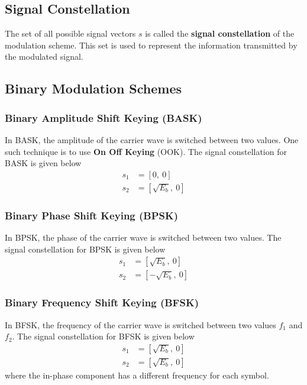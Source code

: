 \documentclass{article}
\begin{document}
\subsection{Signal Constellation}
The set of all possible signal vectors \(s\) is called the
\textbf{signal constellation} of the modulation scheme. This set is
used to represent the information transmitted by the modulated signal.
\subsection{Binary Modulation Schemes}
\subsubsection{Binary Amplitude Shift Keying (BASK)}
In BASK, the amplitude of the carrier wave is switched between two
values. One such technique is to use \textbf{On Off Keying} (OOK). The
signal constellation for BASK is given below
\begin{align*}
    s_1 & = \left[ 0,\: 0 \right]          \\
    s_2 & = \left[ \sqrt{E_b},\: 0 \right]
\end{align*}
\subsubsection{Binary Phase Shift Keying (BPSK)}
In BPSK, the phase of the carrier wave is switched between two values.
The signal constellation for BPSK is given below
\begin{align*}
    s_1 & = \left[ \sqrt{E_b},\: 0 \right]  \\
    s_2 & = \left[ -\sqrt{E_b},\: 0 \right]
\end{align*}
\subsubsection{Binary Frequency Shift Keying (BFSK)}
In BFSK, the frequency of the carrier wave is switched between two
values \(f_1\) and \(f_2\). The signal constellation for BFSK is given
below
\begin{align*}
    s_1 & = \left[ \sqrt{E_b},\: 0 \right] \\
    s_2 & = \left[ \sqrt{E_b},\: 0 \right]
\end{align*}
where the in-phase component has a different frequency for each symbol.
\end{document}

